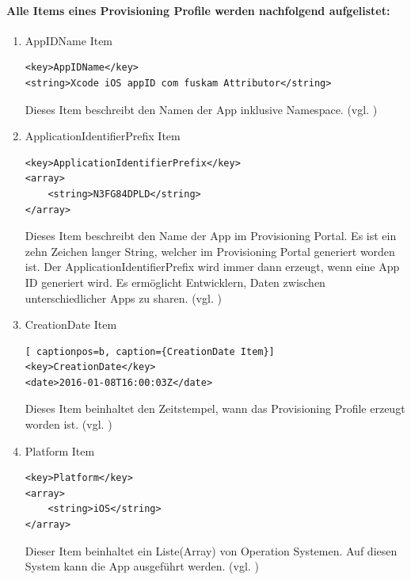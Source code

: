 \paragraph{Alle Items eines Provisioning Profile werden nachfolgend aufgelistet:}
\begin{enumerate}
    \item AppIDName Item

\begin{lstlisting}[captionpos=b, caption={AppIDName Item}]
<key>AppIDName</key>
<string>Xcode iOS appID com fuskam Attributor</string>
\end{lstlisting}
Dieses Item beschreibt den Namen der App inklusive Namespace. (vgl. \cite{iOSSec[5], Hacking[1]})

    \item ApplicationIdentifierPrefix Item
\begin{lstlisting}[captionpos=b, caption={ApplicationIdentifierPrefix Item}]
<key>ApplicationIdentifierPrefix</key>
<array>
    <string>N3FG84DPLD</string>
</array>
\end{lstlisting}
Dieses Item beschreibt den Name der App im Provisioning Portal. Es ist ein zehn Zeichen langer String, welcher im Provisioning Portal generiert worden ist. Der ApplicationIdentifierPrefix wird immer dann erzeugt, wenn eine App ID generiert wird. Es ermöglicht Entwicklern, Daten zwischen unterschiedlicher Apps zu sharen. (vgl. \cite{iOSSec[5], Hacking[1]})

    \item CreationDate Item
\begin{lstlisting}[ captionpos=b, caption={CreationDate Item}]        
<key>CreationDate</key>
<date>2016-01-08T16:00:03Z</date>
\end{lstlisting}
Dieses Item beinhaltet den Zeitstempel, wann das Provisioning Profile erzeugt worden ist. (vgl. \cite{iOSSec[5], Hacking[1]})

    \item Platform Item
\begin{lstlisting}[captionpos=b, caption={Platform Item}]        
<key>Platform</key>
<array>
    <string>iOS</string>
</array>
\end{lstlisting}
Dieser Item beinhaltet ein Liste(Array) von Operation Systemen. Auf diesen System kann die App ausgeführt werden. (vgl. \cite{iOSSec[5], Hacking[1]})


\end{enumerate}
